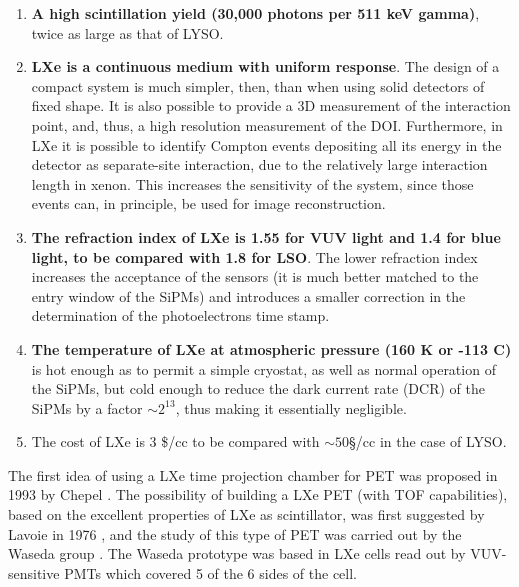 \documentclass[review]{elsarticle}
\begin{document}
\begin{enumerate}
\item {\bf A high scintillation yield (30,000 photons per 511 keV gamma)}, twice as large as that of LYSO. 
\item {\bf LXe is a continuous medium with uniform response}. The design of a compact system is much simpler, then, than when using solid detectors of fixed shape. It is also possible to provide a 3D measurement of the interaction point, and, thus, a high resolution measurement of the DOI. Furthermore, in LXe it is possible to identify Compton events depositing all its energy in the detector as separate-site interaction, due to the relatively large interaction length in xenon. This increases the sensitivity of the system, since those events can, in principle, be used for image reconstruction. 
\item {\bf The refraction index of LXe is 1.55 for VUV light and 1.4 for blue light, to be compared with 1.8 for LSO}. The lower refraction index increases the acceptance of the sensors (it is much better matched to the entry window of the SiPMs) and introduces a smaller correction in the determination of the photoelectrons time stamp. 
\item {\bf The temperature of LXe at atmospheric pressure (160 K or -113 C)} is hot enough as to permit a simple cryostat, as well as normal operation of the SiPMs, but cold enough to reduce the dark current rate (DCR) of the SiPMs by a factor $\sim 2^{13}$, thus making it essentially negligible. 
\item {The cost} of LXe is 3 \$/cc to be compared with $\sim 50$\S/cc in the case of LYSO. 
 \end{enumerate}

The first idea of using a LXe time projection chamber for PET was proposed in 1993 by Chepel \cite{chepelFirst}. 
The possibility of building a LXe PET (with TOF capabilities), based on the excellent properties of LXe as scintillator, was first suggested by Lavoie in 1976 \cite{lavoie}, and the study of this type of PET was carried out by the Waseda group \cite{Doke1,Nishikido2,Nishikido1}. The Waseda prototype was based in LXe cells read out by VUV-sensitive PMTs which covered 5 of the 6 sides of the cell. 
\end{document}

